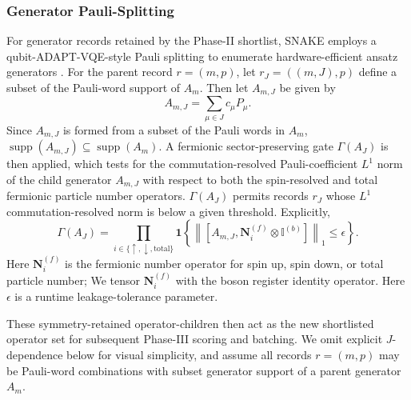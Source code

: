 \documentclass[
  reprint,
  amsmath,
  amssymb,
  aps,
  pra,
  nofootinbib,
  superscriptaddress,
  floatfix
]{revtex4-2}
\begin{document}
\subsubsection{Generator Pauli-Splitting}
For generator records retained by the Phase-II shortlist, \textsc{SNAKE}
employs a qubit-ADAPT-VQE-style Pauli splitting to enumerate
hardware-efficient ansatz generators \cite{Tang2021}. For the parent record
\(r=(m,p)\), let
\(r_J=((m,J),p)\) define a subset of the Pauli-word support of \(A_m\). Then let
\(A_{m,J}\) be given by
\begin{equation}
A_{m,J}=\sum_{\mu\in J}c_{\mu}P_{\mu}.
\label{eq:pauli_child_generator}
\end{equation}
Since \(A_{m,J}\) is formed from a subset of the Pauli words in \(A_m\),
\(\operatorname{supp}(A_{m,J})\subseteq\operatorname{supp}(A_m)\). A fermionic
sector-preserving gate \(\Gamma(A_J)\) is then applied, which tests for the
commutation-resolved Pauli-coefficient \(L^1\) norm of the child generator
\(A_{m,J}\) with respect to both the spin-resolved and total fermionic particle
number operators. \(\Gamma(A_J)\) permits records \(r_J\) whose
\(L^1\) commutation-resolved norm is below a given threshold. Explicitly,
\begin{equation}
\Gamma(A_J)
=
\prod_{i\in\{\uparrow,\downarrow,\mathrm{total}\}}
\mathbf 1
\left\{
\left\|
\left[
A_{m,J},\mathbf N_i^{(f)}\otimes \mathbb I^{(b)}
\right]
\right\|_1
\le \epsilon
\right\}.
\label{eq:symmetry_guard}
\end{equation}
Here \(\mathbf N_i^{(f)}\) is the fermionic number operator for spin up, spin
down, or total particle number; We tensor \(\mathbf N_i^{(f)}\) with the boson
register identity operator. Here \(\epsilon\) is a runtime leakage-tolerance
parameter.

These symmetry-retained operator-children then act as the new shortlisted
operator set for subsequent Phase-III scoring and batching. We omit explicit
\(J\)-dependence below for visual simplicity, and assume all records
\(r=(m,p)\) may be Pauli-word combinations with subset generator support of a
parent generator \(A_m\).
\end{document}

